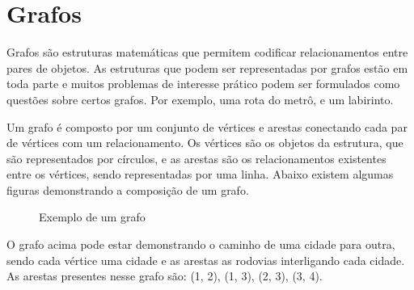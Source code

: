 \section{Grafos}
Grafos são estruturas matemáticas que permitem codificar relacionamentos entre pares de objetos. As estruturas que podem ser representadas por grafos estão em toda parte e muitos problemas de interesse prático podem ser formulados como questões sobre certos grafos. Por exemplo, uma rota do metrô, e um labirinto.

Um grafo é composto por um conjunto de vértices e arestas conectando cada par de vértices com um relacionamento. Os vértices são os objetos da estrutura, que são representados por círculos, e as arestas são os relacionamentos existentes entre os vértices, sendo representadas por uma linha. Abaixo existem algumas figuras demonstrando a composição de um grafo.

\vspace{1cm}

\begin{figure}[!h]
    \centering
    \caption{Exemplo de um grafo}    
\end{figure}

O grafo acima pode estar demonstrando o caminho de uma cidade para outra, sendo cada vértice uma cidade e as arestas as rodovias interligando cada cidade. As arestas presentes nesse grafo são: (1, 2), (1, 3), (2, 3), (3, 4).

\vspace{1cm}

